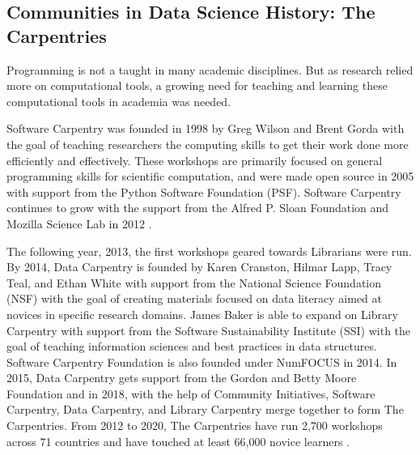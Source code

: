 \documentclass[010-intro.tex]{subfiles}
\begin{document}
    \subsection{Communities in Data Science History: The Carpentries}

        Programming is not a taught in many academic disciplines.
        But as research relied more on computational tools,
        a growing need for teaching and learning these computational tools in academia was needed.

        Software Carpentry was founded in 1998 by Greg Wilson and Brent Gorda with the goal of
        teaching researchers the computing skills to get their work done more efficiently and effectively.
        These workshops are primarily focused on general programming skills for scientific computation,
        and were made open source in 2005 with support from the Python Software Foundation (PSF).
        Software Carpentry continues to grow with the support from the Alfred P. Sloan Foundation and Mozilla Science Lab in 2012
        \cite{CarpentriesHowWe, jordanCarpentries2020Annual}.


        The following year, 2013, the first workshops geared towards Librarians were run.
        By 2014, Data Carpentry is founded by Karen Cranston, Hilmar Lapp, Tracy Teal, and Ethan White
        with support from the National Science Foundation (NSF)
        with the goal of creating materials focused on data literacy aimed at novices in specific research domains.
        James Baker is able to expand on Library Carpentry with support from the Software Sustainability Institute (SSI)
        with the goal of teaching information sciences and best practices in data structures.
        Software Carpentry Foundation is also founded under NumFOCUS in 2014.
        In 2015, Data Carpentry gets support from the Gordon and Betty Moore Foundation and
        in 2018, with the help of Community Initiatives, Software Carpentry, Data Carpentry, and Library Carpentry
        merge together to form The Carpentries.
        From 2012 to 2020, The Carpentries have run
        2,700 workshops across 71 countries and have touched at least 66,000 novice learners
        \cite{CarpentriesHowWe, jordanCarpentries2020Annual}.
\end{document}
